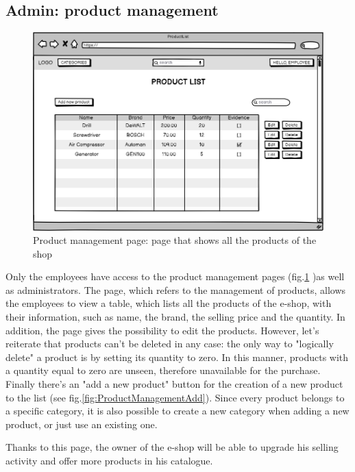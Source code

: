 \subsection{Admin: product management} 
    \begin{figure}[H]
        \centering
        \includegraphics[width=\textwidth,height=0.7\textheight,keepaspectratio]{mockups/productListPageMockup.png}
            \caption{Product management page: page that shows all the products of the shop}
            \label{fig:ProductManagement}
    \end{figure}
Only the employees have access to the product management pages (fig.\ref{fig:ProductManagement} )as well as administrators.
The page, which refers to the management of products, allows the employees to view a table, which lists all the products of the e-shop, with their information, such as name, the brand, the selling price and the quantity. 
In addition, the page gives the possibility to edit the products. However, let's reiterate that products can't be deleted in any case: the only way to "logically delete" a product is by setting its quantity to zero. In this manner, products with a quantity equal to zero are unseen, therefore unavailable for the purchase. 
Finally there's an "add a new product" button for the creation of a new product to the list (see fig.\ref{fig:ProductManagementAdd}). Since every product belongs to a specific category, it is also possible to create a new category when adding a new product, or just use an existing one.

Thanks to this page, the owner of the e-shop will be able to upgrade his selling activity and offer more products in his catalogue. 
    

